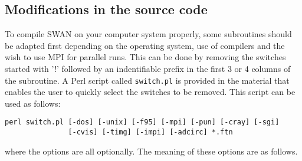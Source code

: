 \documentclass[12pt]{book}
\begin{document}
\subsection{Modifications in the source code}

To compile SWAN on your computer system properly, some subroutines should be adapted first
depending on the operating system, use of compilers and the wish to use MPI for
parallel runs. This can be done by removing the switches started with '!' followed by an
indentifiable prefix in the first 3 or 4 columns of the subroutine. A Perl script called
{\tt switch.pl} is provided in the material that enables the user to quickly select the
switches to be removed. This script can be used as follows:
\begin{verbatim}
perl switch.pl [-dos] [-unix] [-f95] [-mpi] [-pun] [-cray] [-sgi]
               [-cvis] [-timg] [-impi] [-adcirc] *.ftn
\end{verbatim}
where the options are all optionally. The meaning of these options are as follows.
\end{document}
